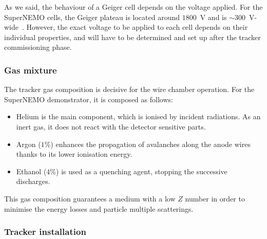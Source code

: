 As we said, the behaviour of a Geiger cell depends on the voltage applied.
For the SuperNEMO cells, the Geiger plateau is located around $1800$~V and is $\sim300$~V-wide~\cite{docdb:tracker_review2014}.
However, the exact voltage to be applied to each cell depends on their individual properties, and will have to be determined and set up after the tracker commissioning phase.


\subsubsection*{Gas mixture}

The tracker gas composition is decisive for the wire chamber operation.
For the SuperNEMO demonstrator, it is composed as follows:
\begin{itemize}
\item Helium is the main component, which is ionised by incident radiations.
  As an inert gas, it does not react with the detector sensitive parts.
\item Argon ($1$\%) enhances the propagation of avalanches along the anode wires thanks to its lower ionisation energy.
\item Ethanol ($4$\%) is used as a quenching agent, stopping the successive discharges.
\end{itemize}
This gas composition guarantees a medium with a low $Z$ number in order to minimise the energy losses and particle multiple scatterings.

\subsubsection*{Tracker installation}

